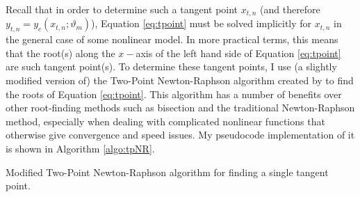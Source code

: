 Recall that in order to determine such a tangent point $x_{t,n}$ (and therefore $y_{t,n}=y_c(x_{t,n};\vartheta_m)$), Equation \eqref{eq:tpoint} must be solved implicitly for $x_{t,n}$ in the general case of some nonlinear model. In more practical terms, this means that the root(s) along the $x-$axis of the left hand side of Equation \eqref{eq:tpoint} are such tangent point(s). To determine these tangent points, I use (a slightly modified version of) the Two-Point Newton-Raphson algorithm created by \textcite{tiruneh2013two} to find the roots of Equation \eqref{eq:tpoint}. This algorithm has a number of benefits over other root-finding methods such as bisection and the traditional Newton-Raphson method, especially when dealing with complicated nonlinear functions that otherwise give convergence and speed issues. My pseudocode implementation of it is shown in Algorithm \ref{algo:tpNR}.%
\begin{algorithm}
\label{algo:tpNR}
\caption{Modified Two-Point Newton-Raphson algorithm for finding a single tangent point.}
\DontPrintSemicolon
\end{algorithm}


